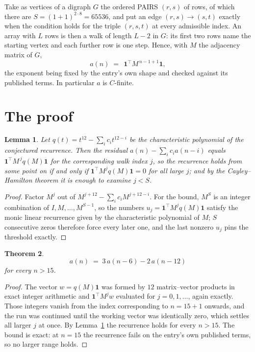 \documentclass[11pt,a4paper]{article}
\theoremstyle{plain}
\newtheorem{theorem}{Theorem}
\newtheorem{lemma}[theorem]{Lemma}
\theoremstyle{definition}
\begin{document}
Take as vertices of a digraph $G$ the ordered PAIRS $(r,s)$ of rows, of which there are
$S=(1+1)^{2\cdot8}=65536$, and put an edge $(r,s)\to(s,t)$ exactly when the condition
holds for the triple $(r,s,t)$ at every admissible index. An array with $L$ rows is then a
walk of length $L-2$ in $G$: its first two rows name the starting vertex and each further
row is one step. Hence, with $M$ the adjacency matrix of $G$,
\[
a(n)\;=\;\,\mathbf{1}^{\!\top}M^{\,n-1+1}\mathbf{1},
\]
the exponent being fixed by the entry's own shape and checked against its published terms.
In particular $a$ is $C$-finite.

\section{The proof}

\begin{lemma}\label{lem:crit}
Let $q(t)=t^{12}-\sum_i c_it^{12-i}$ be the characteristic polynomial of the
conjectured recurrence. Then the residual $a(n)-\sum_ic_ia(n-i)$ equals
$\mathbf{1}^{\!\top}M^{\,j}q(M)\mathbf{1}$ for the corresponding walk index
$j$, so the recurrence holds from some point on if and only if
$\mathbf{1}^{\!\top}M^{j}q(M)\mathbf{1}=0$ for all large $j$; and by the
Cayley--Hamilton theorem it is enough to examine $j<S$.
\end{lemma}

\begin{proof}
Factor $M^{j}$ out of $M^{j+12}-\sum_ic_iM^{j+12-i}$. For the bound, $M^{S}$
is an integer combination of $I,M,\dots,M^{S-1}$, so the numbers
$u_j=\mathbf{1}^{\!\top}M^{j}q(M)\mathbf{1}$ satisfy the monic linear recurrence given by
the characteristic polynomial of $M$; $S$ consecutive zeros therefore force every later one,
and the last nonzero $u_j$ pins the threshold exactly.
\end{proof}

\begin{theorem}
\[
a(n)\;=\;3\,a(n-6) - 2\,a(n-12)
\]
for every $n>15$.
\end{theorem}

\begin{proof}
The vector $w=q(M)\mathbf{1}$ was formed by $12$ matrix--vector products in exact
integer arithmetic and $\mathbf{1}^{\!\top}M^{j}w$ evaluated for $j=0,1,\dots$, again
exactly. Those integers vanish from the index corresponding to $n=15+1$ onwards, and the
run was continued until the working vector was identically zero, which settles all larger $j$
at once. By Lemma~\ref{lem:crit} the recurrence holds for every $n>15$. The bound is exact: at $n=15$ the recurrence fails on the entry's own published terms, so no larger range holds.
\end{proof}
\end{document}
